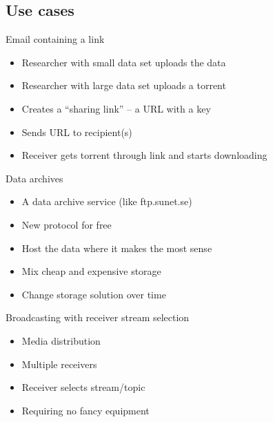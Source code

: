 \documentclass{beamer}
\begin{document}
\subsection{Use cases}
\begin{frame}{Email containing a link}
  \begin{itemize}
  \item
    Researcher with small data set uploads the data
  \item
    Researcher with large data set uploads a torrent
  \item
    Creates a ``sharing link'' -- a URL with a key
  \item
    Sends URL to recipient(s)
  \item
    Receiver gets torrent through link and starts downloading
  \end{itemize}
\end{frame}
\begin{frame}{Data archives}
  \begin{itemize}
  \item
    A data archive service (like ftp.sunet.se)
  \item
    New protocol for free
  \item
    Host the data where it makes the most sense
  \item
    Mix cheap and expensive storage
  \item
    Change storage solution over time
  \end{itemize}
\end{frame}
\begin{frame}{Broadcasting with receiver stream selection}
  \begin{itemize}
  \item
    Media distribution
  \item
    Multiple receivers
  \item
    Receiver selects stream/topic
  \item
    Requiring no fancy equipment
  \end{itemize}
\end{frame}
\end{document}

